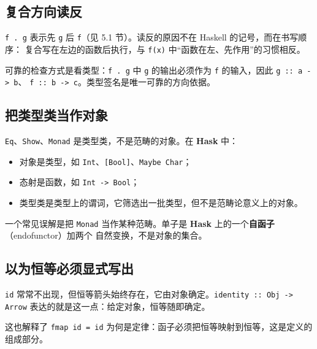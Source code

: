 \subsection{复合方向读反}\label{ux590dux5408ux65b9ux5411ux8bfbux53cd}

\passthrough{\lstinline!f . g!} 表示先 \passthrough{\lstinline!g!} 后 \passthrough{\lstinline!f!}（见 5.1 节）。读反的原因不在 Haskell 的记号，而在书写顺序：
复合写在左边的函数后执行，与 \passthrough{\lstinline!f(x)!} 中“函数在左、先作用”的习惯相反。

可靠的检查方式是看类型：\passthrough{\lstinline!f . g!} 中 \passthrough{\lstinline!g!} 的输出必须作为 \passthrough{\lstinline!f!} 的输入，因此 \passthrough{\lstinline!g :: a -> b!}、
\passthrough{\lstinline!f :: b -> c!}。类型签名是唯一可靠的方向依据。

\subsection{把类型类当作对象}\label{ux628aux7c7bux578bux7c7bux5f53ux4f5cux5bf9ux8c61}

\passthrough{\lstinline!Eq!}、\passthrough{\lstinline!Show!}、\passthrough{\lstinline!Monad!} 是类型类，不是范畴的对象。在 \textbf{Hask} 中：

\begin{itemize}
\tightlist
\item
  对象是类型，如 \passthrough{\lstinline!Int!}、\passthrough{\lstinline![Bool]!}、\passthrough{\lstinline!Maybe Char!}；
\item
  态射是函数，如 \passthrough{\lstinline!Int -> Bool!}；
\item
  类型类是类型上的谓词，它筛选出一批类型，但不是范畴论意义上的对象。
\end{itemize}

一个常见误解是把 \passthrough{\lstinline!Monad!} 当作某种范畴。单子是 \textbf{Hask} 上的一个\textbf{自函子}（endofunctor）加两个
自然变换，不是对象的集合。

\subsection{以为恒等必须显式写出}\label{ux4ee5ux4e3aux6052ux7b49ux5fc5ux987bux663eux5f0fux5199ux51fa}

\passthrough{\lstinline!id!} 常常不出现，但恒等箭头始终存在，它由对象确定。\passthrough{\lstinline!identity :: Obj -> Arrow!} 表达的就是这一点：给定对象，恒等随即确定。

这也解释了 \passthrough{\lstinline!fmap id = id!} 为何是定律：函子必须把恒等映射到恒等，这是定义的组成部分。


